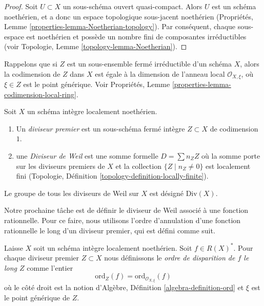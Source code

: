 \begin{proof}
Soit  $U \subset X$  un sous-schéma ouvert quasi-compact. Alors  $U$  est un
schéma noethérien, et a donc un espace topologique sous-jacent noethérien
(Propriétés, Lemme  \ref{properties-lemma-Noetherian-topology}). Par conséquent, chaque sous-espace est
noethérien et possède un nombre fini de composantes irréductibles (voir Topologie,
Lemme  \ref{topology-lemma-Noetherian}).
\end{proof}

\noindent
Rappelons que si  $Z$  est un sous-ensemble fermé irréductible d'un schéma
 $X$, alors la codimension de  $Z$  dans  $X$  est égale à
la dimension de l'anneau local  $\mathcal{O}_{X, \xi}$, où  $\xi \in Z$  est le point
générique. Voir Propriétés, Lemme  \ref{properties-lemma-codimension-local-ring}.

\begin{definition}
\label{definition-Weil-divisor}
Soit  $X$  un schéma intègre localement noethérien.
\begin{enumerate}
\item Un  {\it  diviseur premier}  est un sous-schéma fermé
intègre  $Z \subset X$  de codimension  $1$.
\item une {\it Diviseur de Weil}  est une somme formelle
 $D = \sum n_Z Z$ où la somme porte sur les diviseurs premiers de $X$  et la
collection  $\{Z \mid n_Z \not = 0\}$ est localement fini (Topologie, Définition \ref{topology-definition-locally-finite}).
\end{enumerate}
Le groupe de tous les diviseurs de Weil sur  $X$  est désigné  $\text{Div}(X)$.
\end{definition}

\noindent
Notre prochaine tâche est de définir le diviseur de Weil associé à une fonction
rationnelle. Pour ce faire, nous utilisons l'ordre d'annulation d'une fonction
rationnelle le long d'un diviseur premier, qui est défini comme suit.

\begin{definition}
\label{definition-order-vanishing}
Laisse $X$ soit un schéma intègre localement noethérien. Soit $f \in R(X)^*$.
Pour chaque diviseur premier $Z \subset X$ nous définissons
le {\it ordre de disparition de $f$ le
long $Z$} comme l'entier
$$
\text{ord}_Z(f) = \text{ord}_{\mathcal{O}_{X, \xi}}(f)
$$
où le côté droit est la notion d'Algèbre, Définition  \ref{algebra-definition-ord}  et  $\xi$ 
est le point générique de  $Z$.
\end{definition}

